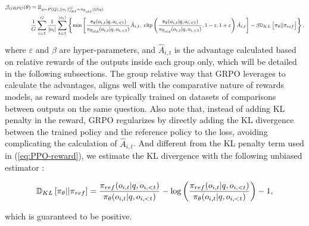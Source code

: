 \begin{itemize}[topsep=0pt]
\begin{itemize}[topsep=0pt]
\begin{equation}
\footnotesize
\begin{split}
    \mathcal{J}_{GRPO}(\theta) &= \mathbb{E}_{q \sim P(Q), \{o_i\}_{i=1}^G \sim \pi_{\theta_{old}}(O|q)}  \\
    & \frac{1}{G}\sum_{i=1}^G\frac{1}{|o_i|} \sum_{t=1}^{|o_i|} \left\{ \min \left[ \frac{\pi_\theta(o_{i,t} | q, o_{i,<t})}{\pi_{\theta_{old}}(o_{i,t} | q, o_{i,<t})} \hat{A}_{i,t},\ \text{clip} \left( \frac{\pi_\theta(o_{i,t} | q, o_{i,<t})}{\pi_{\theta_{old}}(o_{i,t} | q, o_{i,<t})}, 1 - \varepsilon, 1 + \varepsilon \right) \hat{A}_{i,t} \right] - \beta \mathbb{D}_{KL}\left[\pi_{\theta} || \pi_{ref}\right]\right\},
\end{split}
\label{eq:GRPO-obj}
\end{equation}

where $\varepsilon$ and $\beta$ are hyper-parameters, and $\hat{A}_{i,t}$  is the advantage calculated based on relative rewards of the outputs inside each group only, which will be detailed in the following subsections. The group relative way that GRPO leverages to calculate the advantages, aligns well with the comparative nature of rewards models,  as reward models are typically trained on datasets of comparisons between outputs on the same question. Also note that, instead of adding KL penalty in the reward, GRPO regularizes by directly adding the KL divergence between the trained policy and the reference policy to the loss, avoiding complicating the calculation of  $\hat{A}_{i,t}$. And different from the KL penalty term used in (\ref{eq:PPO-reward}), we estimate the KL divergence with the following unbiased estimator \citep{kl_approx}:

\begin{equation}
\small
    \mathbb{D}_{KL}\left[\pi_{\theta} || \pi_{ref}\right] = \frac{\pi_{ref}(o_{i,t}|q,o_{i,<t})}{\pi_{\theta}(o_{i,t}|q,o_{i,<t})} - \log\left(\frac{\pi_{ref}(o_{i,t}|q,o_{i,<t})}{\pi_{\theta}(o_{i,t}|q,o_{i,<t})}\right) - 1,
\end{equation}

which is guaranteed to be positive.


\end{itemize}
\end{itemize}
